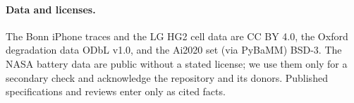 \paragraph{Data and licenses.} The Bonn iPhone traces
\cite{BONN26,SCH26} and the LG HG2 cell data \cite{KOL20} are CC BY 4.0, the Oxford degradation data \cite{OX17}
ODbL v1.0, and the Ai2020 set (via PyBaMM) BSD-3. The NASA battery data \cite{NASA07} are public without a stated
license; we use them only for a secondary check and acknowledge the repository and its donors. Published
specifications and reviews \cite{APL14P,NBC22,NBC23,NBC24,LMAG22,GPX} enter only as cited facts.

